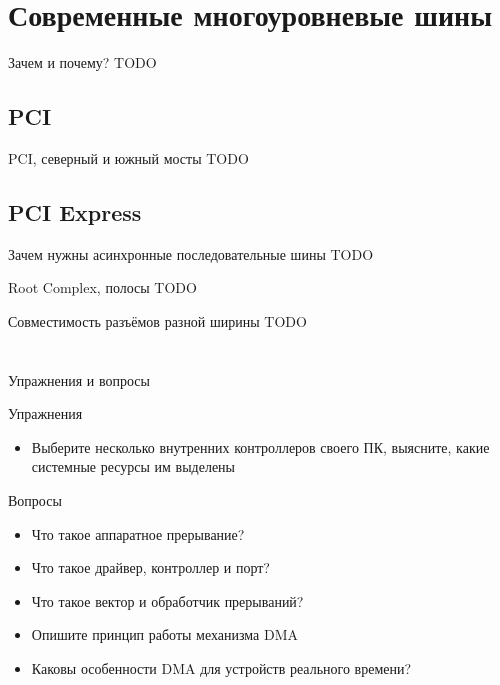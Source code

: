 \documentclass[xetex,aspectratio=43]{beamer}
\begin{document}
\section{Современные многоуровневые шины}

\begin{frame}{Зачем и почему?}
	TODO
\end{frame}

\subsection{PCI}

\begin{frame}{PCI, северный и южный мосты}
	TODO
\end{frame}

\subsection{PCI Express}

\begin{frame}{Зачем нужны асинхронные последовательные шины}
	TODO
\end{frame}

\begin{frame}{Root Complex, полосы}
	TODO
\end{frame}

\begin{frame}{Совместимость разъёмов разной ширины}
	TODO
\end{frame}


\section*{}

\begin{frame}{Упражнения и вопросы}
	\begin{block}{Упражнения}
		\begin{itemize}
			\tightlist
			\item
			Выберите несколько внутренних контроллеров своего ПК, выясните, какие
			системные ресурсы им выделены
		\end{itemize}
	\end{block}

	\begin{block}{Вопросы}
		\begin{itemize}
			\tightlist
			\item
			Что такое аппаратное прерывание?
			\item
			Что такое драйвер, контроллер и порт?
			\item
			Что такое вектор и обработчик прерываний?
			\item
			Опишите принцип работы механизма DMA
			\item
			Каковы особенности DMA для устройств реального времени?
		\end{itemize}
	\end{block}
\end{frame}

\postamble
\end{document}
